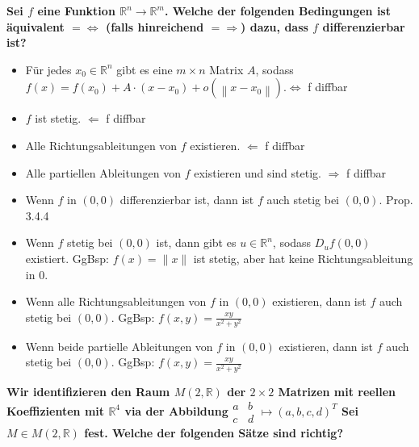 \begin{flushleft}
\textbf{ Sei $f$ eine Funktion $\mathbb{R}^n \rightarrow \mathbb{R}^m$. Welche der folgenden Bedingungen ist äquivalent \textcolor{Emerald}{$=\Leftrightarrow$ (falls hinreichend $=\Rightarrow$)}  dazu, dass $f$ differenzierbar ist?}

\begin{itemize}[leftmargin = *]
\item[\textcolor{green}{W}] Für jedes $x_0 \in \mathbb{R}^n$ gibt es eine $m \times n$ Matrix $A$, sodass $f(x)=f\left(x_0\right)+A \cdot\left(x-x_0\right)+o\left(\left\|x-x_0\right\|\right)$.\textcolor{Emerald}{$\Leftrightarrow$ f diffbar}    
\item[\textcolor{red}{F}]  $f$ ist stetig. \textcolor{Emerald}{$\Leftarrow$ f diffbar} 
\item[\textcolor{red}{F}]  Alle Richtungsableitungen von $f$ existieren. \textcolor{Emerald}{$\Leftarrow$ f diffbar} 
\item[\textcolor{red}{F}]  Alle partiellen Ableitungen von $f$ existieren und sind stetig. \textcolor{Emerald}{$\Rightarrow$ f diffbar} 
\end{itemize}


\begin{itemize}[leftmargin = *]
\item[\textcolor{green}{W}] Wenn $f$ in $(0,0)$ differenzierbar ist, dann ist $f$ auch stetig bei $(0,0)$. \textcolor{Emerald}{Prop. 3.4.4}
\item[\textcolor{red}{F}]  Wenn $f$ stetig bei $(0,0)$ ist, dann gibt es $u \in \mathbb{R}^n$, sodass $D_u f(0,0)$ existiert. \textcolor{Emerald}{GgBsp: $f(x)=\|x\|$ ist stetig, aber hat keine Richtungsableitung in 0.}
\item[\textcolor{red}{F}] Wenn alle Richtungsableitungen von $f$ in $(0,0)$ existieren, dann ist $f$ auch stetig bei $(0,0)$.  \textcolor{Emerald}{GgBsp: $f(x, y)=\frac{x y}{x^2+y^2}$}
\item[\textcolor{red}{F}]  Wenn beide partielle Ableitungen von $f$ in $(0,0)$ existieren, dann ist $f$ auch stetig bei $(0,0)$. \textcolor{Emerald}{GgBsp: $f(x, y)=\frac{x y}{x^2+y^2}$}
\end{itemize}


\textbf{Wir identifizieren den Raum $M(2, \mathbb{R})$ der $2 \times 2$ Matrizen mit reellen Koeffizienten mit $\mathbb{R}^4$ via der Abbildung$
\begin{smallmatrix}
a & b \\
c & d
\end{smallmatrix} \mapsto\left(a,b,c,d\right)^{T}$ Sei $M \in M(2, \mathbb{R})$ fest. Welche der folgenden Sätze sind richtig? }


\end{flushleft}
